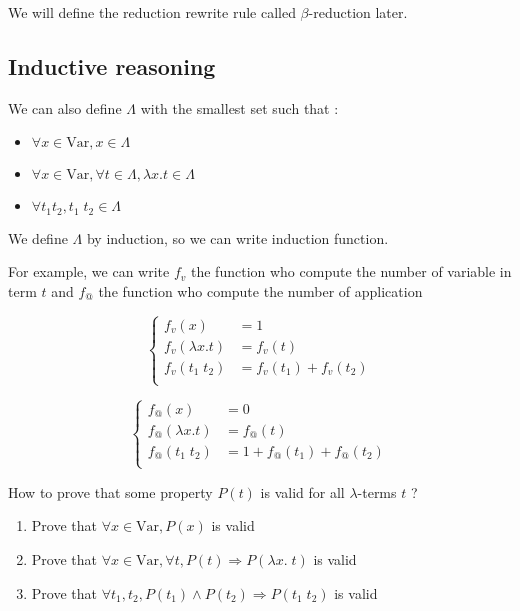 \documentclass{article}
\theoremstyle{plain}
\theoremstyle{plain}
\begin{document}
  We will define the reduction rewrite rule called $\beta$-reduction later.

  \subsection{Inductive reasoning}

  We can also define $\Lambda$ with the smallest set such that :

  \begin{itemize}
    \item $\forall x \in \text{Var}, x \in \Lambda$
    \item $\forall x \in \text{Var}, \forall t \in \Lambda, \lambda x.t \in
      \Lambda$
    \item $\forall t_1 t_2, t_1\; t_2 \in \Lambda$
  \end{itemize}

  We define $\Lambda$ by induction, so we can write induction function.

  For example, we can write $f_v$ the function who compute the number of
  variable in term $t$ and $f_@$ the function who compute the number of
  application
  \begin{multicols}{2}
    \[
        \begin{cases}
            f_v(x) &= 1 \\
            f_v(\lambda x. t) &= f_v(t) \\
            f_v(t_1\; t_2) &= f_v(t_1) + f_v(t_2) \\
        \end{cases}
    \]

    \[
        \begin{cases}
            f_@(x) &= 0 \\
            f_@(\lambda x. t) &= f_@(t) \\
            f_@(t_1\; t_2) &= 1 + f_@(t_1) + f_@(t_2) \\
        \end{cases}
    \]
  \end{multicols}

  How to prove that some property $P(t)$ is valid for all $\lambda$-terms $t$ ?

  \begin{enumerate}
    \item Prove that $\forall x \in \text{Var}, P(x)$ is valid
    \item Prove that $\forall x \in \text{Var}, \forall t, P(t) \Rightarrow
      P(\lambda x.\; t)$ is valid
    \item Prove that $\forall t_1, t_2, P(t_1) \wedge P(t_2) \Rightarrow P(t_1
      \; t_2)$ is valid
  \end{enumerate}
\end{document}
